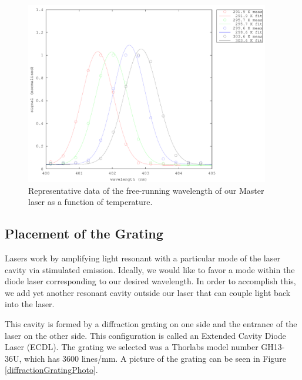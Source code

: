 \begin{figure}
\centering
\includegraphics[width=0.95\textwidth]{temperatureFit} 
\caption[Wavelength of Master laser at different temperatures]{\label{Temperaturespectra} Representative data of the free-running wavelength of our Master laser as a function of temperature.}
\end{figure}

\subsection{Placement of the Grating}



Lasers work by amplifying light resonant with a particular mode of the laser cavity via stimulated emission. Ideally, we would like to favor a mode within the diode laser corresponding to our desired wavelength. In order to accomplish this, we add yet another resonant cavity outside our laser that can couple light back into the laser. 

This cavity is formed by a diffraction grating on one side and the entrance of the laser on the other side. This configuration is called an Extended Cavity Diode Laser (ECDL). The grating we selected was a Thorlabs model number GH13-36U, which has 3600 lines/mm. A picture of the grating can be seen in Figure\,\ref{diffractionGratingPhoto}. 

